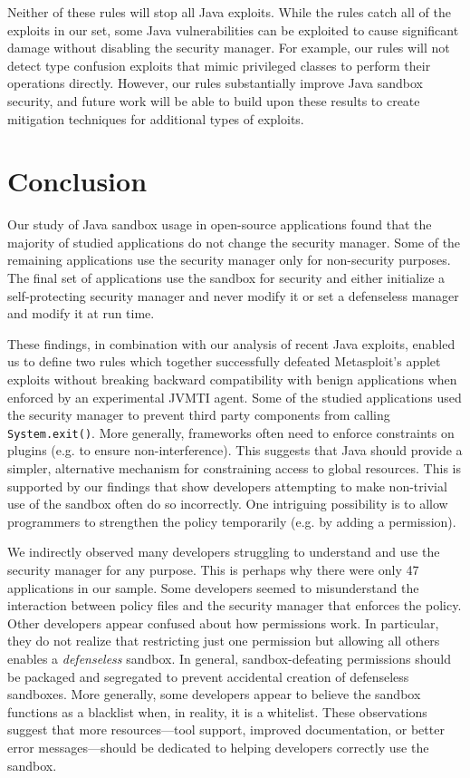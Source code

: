 \documentclass{sig-alternate}
\begin{document}
Neither of these rules will stop all Java exploits. While the rules
catch all of the exploits in our set, some Java vulnerabilities can
be exploited to cause significant damage without disabling the security
manager. For example, our rules will not detect type confusion exploits
that mimic privileged classes to perform their operations directly.
However, our rules substantially improve Java sandbox security, and
future work will be able to build upon these results to create mitigation
techniques for additional types of exploits.

\section{Conclusion}

Our study of Java sandbox usage in open-source applications found
that the majority of studied applications do not change the security
manager. Some of the remaining applications use the security manager
only for non-security purposes. The final set of applications use
the sandbox for security and either initialize a self-protecting security
manager and never modify it or set a defenseless manager and modify
it at run time. 

These findings, in combination with our analysis of recent Java exploits,
enabled us to define two rules which together successfully
defeated Metasploit's applet exploits without breaking backward compatibility with benign applications when enforced by an experimental JVMTI agent. Some of the studied applications
used the security manager to prevent third party components from calling
\texttt{System.exit()}. More generally, frameworks often need to enforce
constraints on plugins (e.g. to ensure non-interference). This suggests
that Java should provide a simpler, alternative mechanism for constraining
access to global resources. This is supported by our findings that
show developers attempting to make non-trivial use of the sandbox
often do so incorrectly. One intriguing possibility is to allow programmers
to strengthen the policy temporarily (e.g. by adding a permission). 

We indirectly observed many developers struggling to understand and
use the security manager for any purpose. This is perhaps why there
were only 47 applications in our sample. Some developers seemed to
misunderstand the interaction between policy files and the security
manager that enforces the policy. Other developers appear confused
about how permissions work. In particular, they do not realize that
restricting just one permission but allowing all others enables a
\emph{defenseless} sandbox. In general, sandbox-defeating permissions
should be packaged and segregated to prevent accidental creation of
defenseless sandboxes. More generally, some developers appear to believe
the sandbox functions as a blacklist when, in reality, it is a whitelist.
These observations suggest that more resources---tool support, improved
documentation, or better error messages---should be dedicated to helping
developers correctly use the sandbox. 



\end{document}
